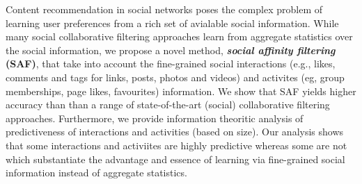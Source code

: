 Content recommendation in social networks poses the complex problem of
learning user preferences from a rich set of avialable social information.
While many social collaborative filtering approaches learn from aggregate statistics over the
social information, we propose a novel method, \textbf{\textit{social affinity filtering} (SAF)}, 
that take into account the fine-grained social interactions (e.g., likes, comments and tags for 
links, posts, photos and videos) and activites (eg, group memberships, page likes, favourites) 
information. We show that SAF yields higher accuracy than than a range of state-of-the-art 
(social) collaborative filtering approaches.
Furthermore, we provide information theoritic analysis of predictiveness of interactions and activities (based
on size).
Our analysis shows that some interactions and activiites are highly predictive whereas some are not
which substantiate the advantage and essence of learning via fine-grained social information instead
of aggregate statistics.




